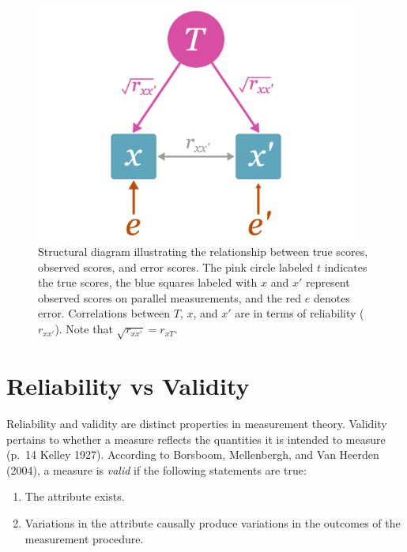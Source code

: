 \documentclass[
  letterpaper,
  DIV=11,
  numbers=noendperiod]{scrreprt}
\begin{document}
\begin{figure}

{\centering \includegraphics[width=4.16667in,height=\textheight]{figure/unreliability_diagram_1.png}

}

\caption{Structural diagram illustrating the relationship between true
scores, observed scores, and error scores. The pink circle labeled \(t\)
indicates the true scores, the blue squares labeled with \(x\) and
\(x'\) represent observed scores on parallel measurements, and the red
\(e\) denotes error. Correlations between \(T\), \(x\), and \(x'\) are
in terms of reliability (\(r_{xx'}\)). Note that
\(\sqrt{r_{xx'}}=r_{xT}\).}

\end{figure}

\hypertarget{reliability-vs-validity}{%
\section{Reliability vs Validity}\label{reliability-vs-validity}}

Reliability and validity are distinct properties in measurement theory.
Validity pertains to whether a measure reflects the quantities it is
intended to measure (p.~14 Kelley 1927). According to Borsboom,
Mellenbergh, and Van Heerden (2004), a measure is \emph{valid} if the
following statements are true:

\begin{enumerate}
\def\labelenumi{\arabic{enumi}.}
\item
  The attribute exists.
\item
  Variations in the attribute causally produce variations in the
  outcomes of the measurement procedure.
\end{enumerate}
\end{document}
